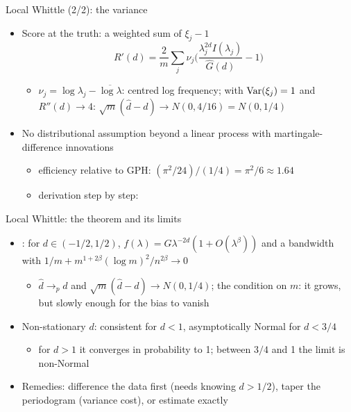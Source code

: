 \begin{frame}{Local Whittle (2/2): the variance}
\itemsize{\small}
\begin{itemize}
    \item Score at the truth: a weighted sum of $\xi_j - 1$
    \[ R'(d) = \frac{2}{m}\sum_j\nu_j\Big(\frac{\lambda_j^{2d}I(\lambda_j)}{\hat G(d)} - 1\Big) \]
    \begin{itemize}
        \item $\nu_j = \log\lambda_j - \overline{\log\lambda}$: centred log frequency; with $\text{Var}(\xi_j) = 1$ and $R''(d) \to 4$: $\sqrt m(\hat d - d) \to N(0, 4/16) = N(0, 1/4)$
    \end{itemize}
    \item No distributional assumption beyond a linear process with martingale-difference innovations
    \begin{itemize}
        \item efficiency relative to GPH: $(\pi^2/24)/(1/4) = \pi^2/6 \approx 1.64$
        \item derivation step by step:   %
    \end{itemize}
\end{itemize}
\end{frame}

\begin{frame}{Local Whittle: the theorem and its limits}
\itemsize{\small}
\begin{itemize}
    \item {}: for $d \in (-1/2, 1/2)$, $f(\lambda) = G\lambda^{-2d}(1 + O(\lambda^\beta))$ and a bandwidth with $1/m + m^{1+2\beta}(\log m)^2/n^{2\beta} \to 0$
    \begin{itemize}
        \item $\hat d \to_p d$ and $\sqrt m(\hat d - d) \to N(0, 1/4)$; the condition on $m$: it grows, but slowly enough for the bias to vanish
    \end{itemize}
    \item Non-stationary $d$: consistent for $d < 1$, asymptotically Normal for $d < 3/4$ 
    \begin{itemize}
        \item for $d > 1$ it converges in probability to 1; between $3/4$ and 1 the limit is non-Normal 
    \end{itemize}
    \item Remedies: difference the data first (needs knowing $d > 1/2$), taper the periodogram (variance cost), or estimate exactly
\end{itemize}
\end{frame}

